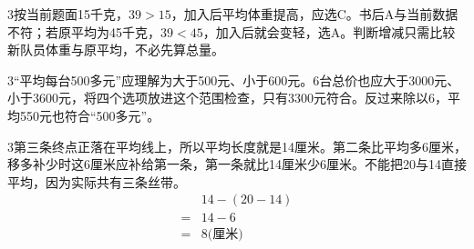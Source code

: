\documentclass[multi=snippet,border={5bp 20bp 5bp 5bp}]{standalone}
\newenvironment{snippet}[3]{\begin{minipage}{#1bp}\color{answerred}\fontsize{#2}{#3}\selectfont\raggedright}{\end{minipage}}
\begin{document}
\begin{snippet}{505}{11.5}{14}\begin{multicols}{3}\raggedcolumns 按当前题面15千克，\(39>15\)\allowbreak ，加入后平均体重提高，应选C。书后A与当前数据不符；若原平均为45千克，\(39<45\)\allowbreak ，加入后就会变轻，选A。判断增减只需比较新队员体重与原平均，不必先算总量。\end{multicols}\end{snippet}
\begin{snippet}{505}{11.5}{14}\begin{multicols}{3}\raggedcolumns “平均每台500多元”应理解为大于500元、小于600元。6台总价也应大于3000元、小于3600元，将四个选项放进这个范围检查，只有3300元符合。反过来除以6，平均550元也符合“500多元”。\end{multicols}\end{snippet}
\begin{snippet}{505}{11.5}{14}\begin{multicols}{3}\raggedcolumns 第三条终点正落在平均线上，所以平均长度就是14厘米。第二条比平均多6厘米，移多补少时这6厘米应补给第一条，第一条就比14厘米少6厘米。不能把20与14直接平均，因为实际共有三条丝带。\[\begin{aligned}&14-(20-14)\\={}&14-6\\={}&8\text{(厘米)}\end{aligned}\]\end{multicols}\end{snippet}
\end{document}
